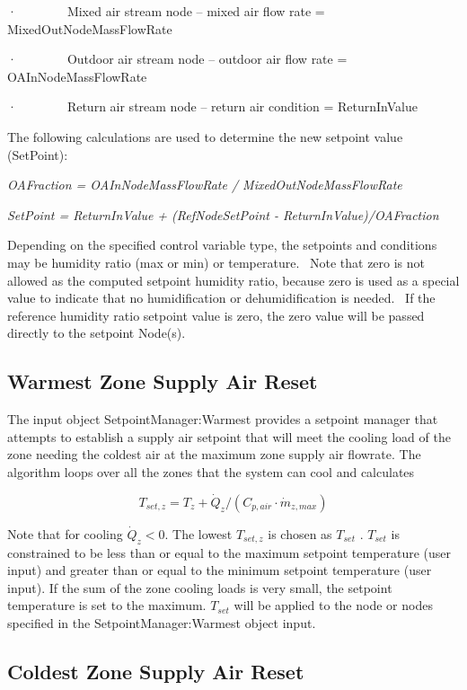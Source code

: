 ·~~~~~~~~Mixed air stream node -- mixed air flow rate = MixedOutNodeMassFlowRate

·~~~~~~~~Outdoor air stream node -- outdoor air flow rate = OAInNodeMassFlowRate

·~~~~~~~~Return air stream node -- return air condition = ReturnInValue

The following calculations are used to determine the new setpoint value (SetPoint):

\emph{OAFraction = OAInNodeMassFlowRate / MixedOutNodeMassFlowRate}

\emph{SetPoint = ReturnInValue + (RefNodeSetPoint - ReturnInValue)/OAFraction}

Depending on the specified control variable type, the setpoints and conditions may be humidity ratio (max or min) or temperature.~ Note that zero is not allowed as the computed setpoint humidity ratio, because zero is used as a special value to indicate that no humidification or dehumidification is needed.~ If the reference humidity ratio setpoint value is zero, the zero value will be passed directly to the setpoint Node(s).

\subsection{Warmest Zone Supply Air Reset}\label{warmest-zone-supply-air-reset}

The input object SetpointManager:Warmest provides a setpoint manager that attempts to establish a supply air setpoint that will meet the cooling load of the zone needing the coldest air at the maximum zone supply air flowrate. The algorithm loops over all the zones that the system can cool and calculates

\begin{equation}
{T_{set,z}} = {T_z} + {\dot Q_z}/({C_{p,air}}\cdot {\dot m_{z,max}})
\end{equation}

Note that for cooling \({\dot Q_z} < 0.\) The lowest \({T_{set,z}}\) is chosen as \({T_{set}}\) . \({T_{set}}\) is constrained to be less than or equal to the maximum setpoint temperature (user input) and greater than or equal to the minimum setpoint temperature (user input). If the sum of the zone cooling loads is very small, the setpoint temperature is set to the maximum. \({T_{set}}\) will be applied to the node or nodes specified in the SetpointManager:Warmest object input.

\subsection{Coldest Zone Supply Air Reset}\label{coldest-zone-supply-air-reset}


